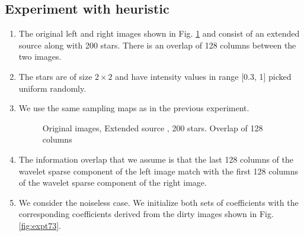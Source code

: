 \subsection{Experiment with heuristic}
\begin{enumerate}
\item The original left and right images shown in Fig. \ref{fig:expt71} and consist of an extended source along with 200 stars. There is an overlap of 128 columns between the two images.
\item The stars are of size $2 \times 2$ and have intensity values in range [0.3, 1] picked uniform randomly.
\item We use the same sampling maps as in the previous experiment.

\begin{figure}[h!]
\hspace{0.4in}
		\hspace{0.2in}
\caption [Original images, Extended source, 200 stars]{Original images, Extended source , 200 stars. Overlap of 128 columns}
\label{fig:expt71}
\end{figure}
\item The information overlap that we assume is that the last 128 columns of the wavelet sparse component of the left image match with the first 128 columns of the wavelet sparse component of the right image.
\item We consider the noiseless case. We initialize both sets of coefficients with the corresponding coefficients derived from the dirty images shown in Fig. \ref{fig:expt73}.


\end{enumerate}
